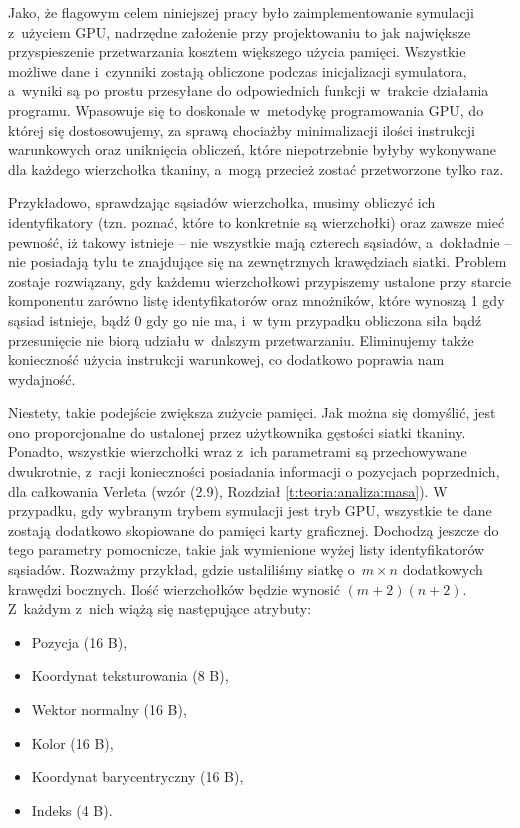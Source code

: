 	Jako, że flagowym celem niniejszej pracy było zaimplementowanie symulacji z~użyciem GPU, nadrzędne założenie przy projektowaniu to jak największe przyspieszenie przetwarzania kosztem większego użycia pamięci. Wszystkie możliwe dane i~czynniki zostają obliczone podczas inicjalizacji symulatora, a~wyniki są po prostu przesyłane do odpowiednich funkcji w~trakcie działania programu. Wpasowuje się to doskonale w~metodykę programowania GPU, do której się dostosowujemy, za sprawą chociażby minimalizacji ilości instrukcji warunkowych oraz uniknięcia obliczeń, które niepotrzebnie byłyby wykonywane dla każdego wierzchołka tkaniny, a~mogą przecież zostać przetworzone tylko raz. 
	
	Przykładowo, sprawdzając sąsiadów wierzchołka, musimy obliczyć ich identyfikatory (tzn. poznać, które to konkretnie są wierzchołki) oraz zawsze mieć pewność, iż takowy istnieje -- nie wszystkie mają czterech sąsiadów, a~dokładnie -- nie posiadają tylu te znajdujące się na zewnętrznych krawędziach siatki. Problem zostaje rozwiązany, gdy każdemu wierzchołkowi przypiszemy ustalone przy starcie komponentu zarówno listę identyfikatorów oraz mnożników, które wynoszą 1 gdy sąsiad istnieje, bądź 0 gdy go nie ma, i~w tym przypadku obliczona siła bądź przesunięcie nie biorą udziału w~dalszym przetwarzaniu. Eliminujemy także konieczność użycia instrukcji warunkowej, co dodatkowo poprawia nam wydajność. 
	
	Niestety, takie podejście zwiększa zużycie pamięci. Jak można się domyślić, jest ono proporcjonalne do ustalonej przez użytkownika gęstości siatki tkaniny. Ponadto, wszystkie wierzchołki wraz z~ich parametrami są przechowywane dwukrotnie, z~racji konieczności posiadania informacji o pozycjach poprzednich, dla całkowania Verleta (wzór (2.9), Rozdział \ref{t:teoria:analiza:masa}). W przypadku, gdy wybranym trybem symulacji jest tryb GPU, wszystkie te dane zostają dodatkowo skopiowane do pamięci karty graficznej. Dochodzą jeszcze do tego parametry pomocnicze, takie jak wymienione wyżej listy identyfikatorów sąsiadów. Rozważmy przykład, gdzie ustaliliśmy siatkę o~\(m \times n\) dodatkowych krawędzi bocznych. Ilość wierzchołków będzie wynosić \( (m + 2)(n + 2) \). Z~każdym z~nich wiążą się następujące atrybuty:
	
	\begin{itemize}
		\item Pozycja (16 B),
		\item Koordynat teksturowania (8 B),
		\item Wektor normalny (16 B),
		\item Kolor (16 B),
		\item Koordynat barycentryczny (16 B),
		\item Indeks (4 B).
	\end{itemize}
	
